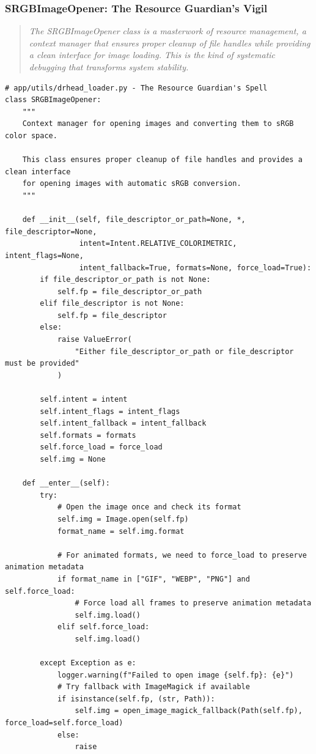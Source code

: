 \documentclass[11pt]{article}
\begin{document}
\subsubsection{SRGBImageOpener: The Resource Guardian's Vigil}

\begin{quote}
\emph{The SRGBImageOpener class is a masterwork of resource management, a context manager that ensures proper cleanup of file handles while providing a clean interface for image loading. This is the kind of systematic debugging that transforms system stability.}
\end{quote}

\begin{lstlisting}[style=python]
# app/utils/drhead_loader.py - The Resource Guardian's Spell
class SRGBImageOpener:
    """
    Context manager for opening images and converting them to sRGB color space.
    
    This class ensures proper cleanup of file handles and provides a clean interface
    for opening images with automatic sRGB conversion.
    """
    
    def __init__(self, file_descriptor_or_path=None, *, file_descriptor=None,
                 intent=Intent.RELATIVE_COLORIMETRIC, intent_flags=None,
                 intent_fallback=True, formats=None, force_load=True):
        if file_descriptor_or_path is not None:
            self.fp = file_descriptor_or_path
        elif file_descriptor is not None:
            self.fp = file_descriptor
        else:
            raise ValueError(
                "Either file_descriptor_or_path or file_descriptor must be provided"
            )
        
        self.intent = intent
        self.intent_flags = intent_flags
        self.intent_fallback = intent_fallback
        self.formats = formats
        self.force_load = force_load
        self.img = None
    
    def __enter__(self):
        try:
            # Open the image once and check its format
            self.img = Image.open(self.fp)
            format_name = self.img.format

            # For animated formats, we need to force_load to preserve animation metadata
            if format_name in ["GIF", "WEBP", "PNG"] and self.force_load:
                # Force load all frames to preserve animation metadata
                self.img.load()
            elif self.force_load:
                self.img.load()

        except Exception as e:
            logger.warning(f"Failed to open image {self.fp}: {e}")
            # Try fallback with ImageMagick if available
            if isinstance(self.fp, (str, Path)):
                self.img = open_image_magick_fallback(Path(self.fp), force_load=self.force_load)
            else:
                raise


\end{lstlisting}
\end{document}

